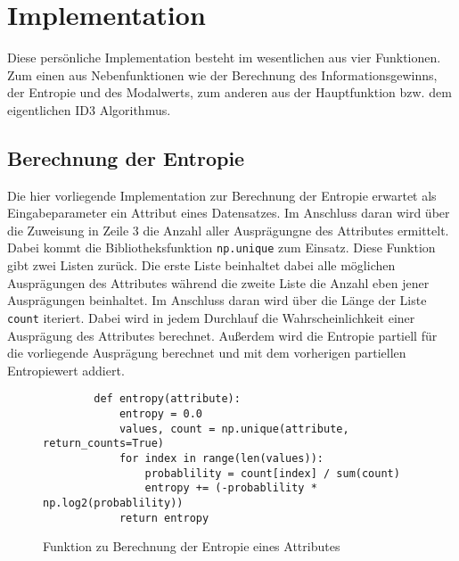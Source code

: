 \section{Implementation}
\label{id3:implementation}

Diese persönliche Implementation besteht im wesentlichen aus vier Funktionen. Zum einen aus Nebenfunktionen wie der Berechnung des Informationsgewinns, der Entropie und des Modalwerts, zum anderen aus der Hauptfunktion bzw. dem eigentlichen ID3 Algorithmus.

\subsection{Berechnung der Entropie}
\label{id3:implementation-entropie}
Die hier vorliegende Implementation zur Berechnung der Entropie erwartet als Eingabeparameter ein Attribut eines Datensatzes. Im Anschluss daran wird über die Zuweisung in Zeile 3 die Anzahl aller Ausprägungne des Attributes ermittelt. Dabei kommt die Bibliotheksfunktion \texttt{np.unique} zum Einsatz. Diese Funktion gibt zwei Listen zurück. Die erste Liste beinhaltet dabei alle möglichen Ausprägungen des Attributes während die zweite Liste die Anzahl eben jener Ausprägungen beinhaltet. Im Anschluss daran wird über die Länge der Liste \texttt{count} iteriert. Dabei wird in jedem Durchlauf die Wahrscheinlichkeit einer Ausprägung des Attributes berechnet. Außerdem wird die Entropie partiell für die vorliegende Ausprägung berechnet und mit dem vorherigen partiellen Entropiewert addiert.

\begin{figure}[H]
    \vspace{0.5cm}
    \centering
    \begin{verbatim}
        def entropy(attribute):
            entropy = 0.0
            values, count = np.unique(attribute, return_counts=True)
            for index in range(len(values)):
                probablility = count[index] / sum(count)
                entropy += (-probablility * np.log2(probablility))
            return entropy
    \end{verbatim}
    \caption{Funktion zu Berechnung der Entropie eines Attributes\autocites{PythonCourseDecisionTrees:online}{ImplementationID3}}
\end{figure}

